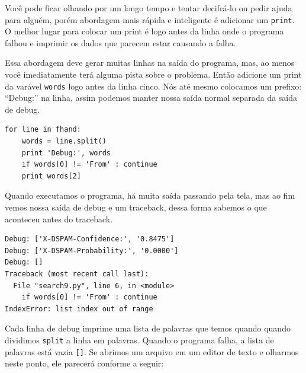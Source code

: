 \begin{enumerate}
Você pode ficar olhando por um longo tempo e tentar decifrá-lo ou
pedir ajuda para alguém, porém abordagem mais rápida e inteligente
é adicionar um {\tt print}. O melhor lugar para colocar um print é
logo antes da linha onde o programa falhou e imprimir os dados que 
parecem estar causando a falha.



Essa abordagem deve gerar muitas linhas na saída do programa,
mas, ao menos você imediatamente terá alguma pista sobre o problema.
Então adicione um print da varável {\tt words} logo antes da linha cinco.
Nós até mesmo colocamos um prefixo: ``Debug:'' na linha, assim podemos 
manter nossa saída normal separada da saída de debug.


\beforeverb
\begin{verbatim}
for line in fhand:
    words = line.split()
    print 'Debug:', words
    if words[0] != 'From' : continue
    print words[2]
\end{verbatim}
\afterverb
%
Quando executamos o programa, há muita saída passando pela tela,
mas ao fim vemos nossa saída de debug e um traceback, dessa forma
sabemos o que aconteceu antes do traceback.


\beforeverb
\begin{verbatim}
Debug: ['X-DSPAM-Confidence:', '0.8475']
Debug: ['X-DSPAM-Probability:', '0.0000']
Debug: []
Traceback (most recent call last):
  File "search9.py", line 6, in <module>
    if words[0] != 'From' : continue
IndexError: list index out of range
\end{verbatim}
\afterverb
%
Cada linha de debug imprime uma lista de palavras que temos quando
quando dividimos {\tt split}  a linha em palavras. Quando o programa
falha, a lista de palavras está vazia \verb"[]". Se abrimos um arquivo
em um editor de texto e olharmos neste ponto, ele parecerá conforme a seguir:


\end{enumerate}
